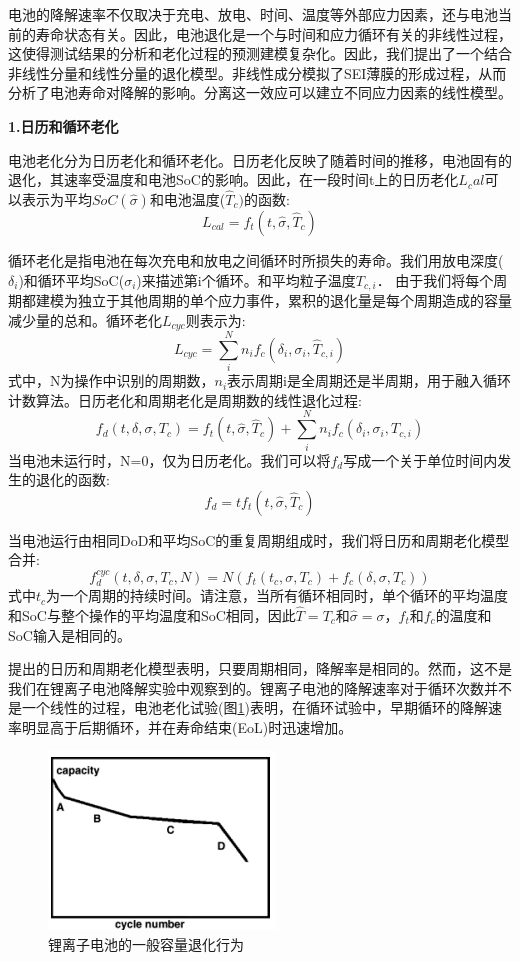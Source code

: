 \documentclass[12pt]{ctexart}%
\begin{document}
电池的降解速率不仅取决于充电、放电、时间、温度等外部应力因素，还与电池当前的寿命状态有关。因此，电池退化是一个与时间和应力循环有关的非线性过程，这使得测试结果的分析和老化过程的预测建模复杂化。因此，我们提出了一个结合非线性分量和线性分量的退化模型。非线性成分模拟了SEI薄膜的形成过程，从而分析了电池寿命对降解的影响。分离这一效应可以建立不同应力因素的线性模型。

\noindent\textbf{1.日历和循环老化}

电池老化分为日历老化和循环老化\cite{VETTER2005269}\cite{laresgoiti2015modeling}\cite{wang2011cycle}\cite{millner2010modeling}\cite{kassem2012calendar}。日历老化反映了随着时间的推移，电池固有的退化，其速率受温度和电池SoC的影响。因此，在一段时间t上的日历老化$L_cal$可以表示为平均$SoC(\hat{\sigma})$和电池温度($\hat{T}_c)$的函数:
$$L_{cal} = f_t(t,\hat{\sigma},\hat{T}_c)$$

循环老化是指电池在每次充电和放电之间循环时所损失的寿命。我们用放电深度($\delta _i$)和循环平均SoC($\sigma_i$)来描述第i个循环。和平均粒子温度$T_{c,i}$． 由于我们将每个周期都建模为独立于其他周期的单个应力事件，累积的退化量是每个周期造成的容量减少量的总和。循环老化$L_{cyc}$则表示为:
$$L_{cyc} = \sum_{i}^{N}n_if_c(\delta _i,\sigma_i,\hat{T}_{c,i})$$
式中，N为操作中识别的周期数，$n_i$表示周期i是全周期还是半周期，用于融入循环计数算法。日历老化和周期老化是周期数的线性退化过程:
$$f_d(t,\delta,\sigma,T_c) = f_t(t,\hat{\sigma},\hat{T}_c) + \sum_{i}^{N}n_if_c(\delta_i,\sigma_i,T_{c,i})$$
当电池未运行时，N=0，仅为日历老化。我们可以将$f_d$写成一个关于单位时间内发生的退化的函数:
$$f_d = tf_t(t,\hat{\sigma},\hat{T}_c)$$

当电池运行由相同DoD和平均SoC的重复周期组成时，我们将日历和周期老化模型合并:
$$f_d^{cyc}(t,\delta,\sigma,T_c,N) = N(f_t(t_c,\sigma,T_c) + f_c(\delta,\sigma,T_c))$$
式中$t_c$为一个周期的持续时间。请注意，当所有循环相同时，单个循环的平均温度和SoC与整个操作的平均温度和SoC相同，因此$\hat{T} = T_c$和$\hat{\sigma} = \sigma$，$f_t$和$f_c$的温度和SoC输入是相同的。

提出的日历和周期老化模型表明，只要周期相同，降解率是相同的。然而，这不是我们在锂离子电池降解实验中观察到的。锂离子电池的降解速率对于循环次数并不是一个线性的过程，电池老化试验(图\ref{z})表明，在循环试验中，早期循环的降解速率明显高于后期循环，并在寿命结束(EoL)时迅速增加。

\begin{figure}[h]
	\centering
	\includegraphics[scale = 0.7]{3}
	\caption{锂离子电池的一般容量退化行为}
	\label{z}
\end{figure}
\end{document}
